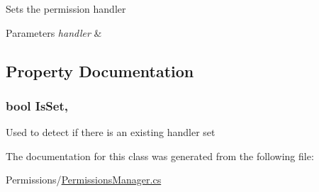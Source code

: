 Sets the permission handler 


\begin{DoxyParams}{Parameters}
{\em handler} & \\
\hline
\end{DoxyParams}


\subsection{Property Documentation}
\hypertarget{classOTA_1_1Permissions_1_1PermissionsManager_af3b42c102ec72dee63cf76a4e02e740a}{}
\subsubsection[{Is\+Set}]{\setlength{\rightskip}{0pt plus 5cm}bool Is\+Set\hspace{0.3cm}{\ttfamily [static]}, {\ttfamily [get]}}\label{classOTA_1_1Permissions_1_1PermissionsManager_af3b42c102ec72dee63cf76a4e02e740a}


Used to detect if there is an existing handler set 



The documentation for this class was generated from the following file\+:\begin{DoxyCompactItemize}
\item 
Permissions/\hyperlink{PermissionsManager_8cs}{Permissions\+Manager.\+cs}\end{DoxyCompactItemize}
